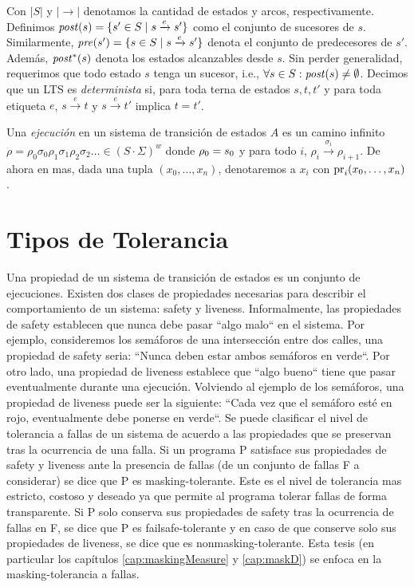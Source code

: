 Con $|S|$ y $|{\rightarrow}|$ denotamos la cantidad de estados y arcos, respectivamente. Definimos $\mathit{post}(s) = \{s' \in S \mid s \xrightarrow{e} s' \}$ como el conjunto de sucesores de $s$. Similarmente,  $\mathit{pre}(s') = \{s \in S \mid s \xrightarrow{e} s' \}$ denota el conjunto de predecesores de $s'$.
Además, $\mathit{post}^{*}(s)$ denota los estados alcanzables desde $s$.
Sin perder generalidad, requerimos que todo estado $s$ tenga un sucesor, i.e., $\forall s \in S : \mathit{post}(s) \neq \emptyset$. Decimos que un LTS es \emph{determinista} si, para toda terna de estados  $s,t, t'$ y para toda etiqueta $e$, $s \xrightarrow{e} t$ y $s \xrightarrow{e} t'$ implica $t=t'$. 

Una \emph{ejecución} en un sistema de transición de estados $A$ es un camino infinito $\rho = \rho_0 \sigma_0 \rho_1 \sigma_1  \rho_2 \sigma_2 \dots \in (S \cdot \Sigma)^{w}$ 
donde $\rho_0 = s_0$ y para todo $i$, $\rho_i \xrightarrow{\sigma_i} \rho_{i+1}$. De ahora en mas, dada una tupla $(x_0,\dots,x_n)$, denotaremos a $x_i$ con  $\operatorname{pr}_{i}(x_0,\dots,x_n)$.

\section{Tipos de Tolerancia}
Una propiedad de un sistema de transición de estados es un conjunto de ejecuciones.
Existen dos clases de propiedades necesarias para describir el comportamiento de un sistema: safety y liveness. 
Informalmente, las propiedades de safety establecen que nunca debe pasar ``algo malo`` en el sistema. Por ejemplo, consideremos los semáforos de una intersección entre dos calles, una propiedad de safety seria: ``Nunca deben estar ambos semáforos en verde``.
Por otro lado, una propiedad de liveness establece que ``algo bueno`` tiene que pasar eventualmente durante una ejecución. Volviendo al ejemplo de los semáforos, una propiedad de liveness puede ser la siguiente: ``Cada vez que el semáforo esté en rojo, eventualmente debe ponerse en verde``.
Se puede clasificar el nivel de tolerancia a fallas de un sistema de acuerdo a las propiedades que se preservan tras la ocurrencia de una falla.
Si un programa P satisface sus propiedades de safety y liveness ante la presencia de fallas (de un conjunto de fallas F a considerar) se dice que P es masking-tolerante. Este es el nivel de tolerancia mas estricto, costoso y deseado ya que permite al programa tolerar fallas de forma transparente.
Si P solo conserva sus propiedades de safety tras la ocurrencia de fallas en F, se dice que P es failsafe-tolerante y en caso de que conserve solo sus propiedades de liveness, se dice que es nonmasking-tolerante.
Esta tesis (en particular los capítulos \ref{cap:maskingMeasure} y \ref{cap:maskD}) se enfoca en la masking-tolerancia a fallas.


